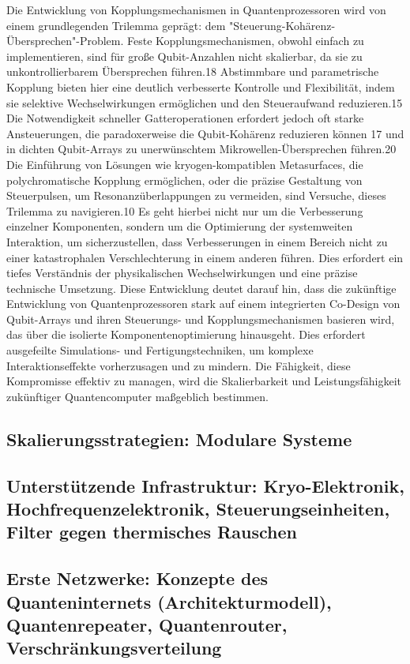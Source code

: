 Die Entwicklung von Kopplungsmechanismen in Quantenprozessoren wird von einem grundlegenden Trilemma geprägt: dem "Steuerung-Kohärenz-Übersprechen"-Problem. Feste Kopplungsmechanismen, obwohl einfach zu implementieren, sind für große Qubit-Anzahlen nicht skalierbar, da sie zu unkontrollierbarem Übersprechen führen.18 Abstimmbare und parametrische Kopplung bieten hier eine deutlich verbesserte Kontrolle und Flexibilität, indem sie selektive Wechselwirkungen ermöglichen und den Steueraufwand reduzieren.15 Die Notwendigkeit schneller Gatteroperationen erfordert jedoch oft starke Ansteuerungen, die paradoxerweise die Qubit-Kohärenz reduzieren können 17 und in dichten Qubit-Arrays zu unerwünschtem Mikrowellen-Übersprechen führen.20 Die Einführung von Lösungen wie kryogen-kompatiblen Metasurfaces, die polychromatische Kopplung ermöglichen, oder die präzise Gestaltung von Steuerpulsen, um Resonanzüberlappungen zu vermeiden, sind Versuche, dieses Trilemma zu navigieren.10 Es geht hierbei nicht nur um die Verbesserung einzelner Komponenten, sondern um die Optimierung der systemweiten Interaktion, um sicherzustellen, dass Verbesserungen in einem Bereich nicht zu einer katastrophalen Verschlechterung in einem anderen führen. Dies erfordert ein tiefes Verständnis der physikalischen Wechselwirkungen und eine präzise technische Umsetzung. Diese Entwicklung deutet darauf hin, dass die zukünftige Entwicklung von Quantenprozessoren stark auf einem integrierten Co-Design von Qubit-Arrays und ihren Steuerungs- und Kopplungsmechanismen basieren wird, das über die isolierte Komponentenoptimierung hinausgeht. Dies erfordert ausgefeilte Simulations- und Fertigungstechniken, um komplexe Interaktionseffekte vorherzusagen und zu mindern. Die Fähigkeit, diese Kompromisse effektiv zu managen, wird die Skalierbarkeit und Leistungsfähigkeit zukünftiger Quantencomputer maßgeblich bestimmen.

\subsection{Skalierungsstrategien: Modulare Systeme}
\subsection{Unterstützende Infrastruktur: Kryo-Elektronik, Hochfrequenzelektronik, Steuerungseinheiten, Filter gegen thermisches Rauschen}
\subsection{Erste Netzwerke: Konzepte des Quanteninternets (Architekturmodell), Quantenrepeater, Quantenrouter, Verschränkungsverteilung}

